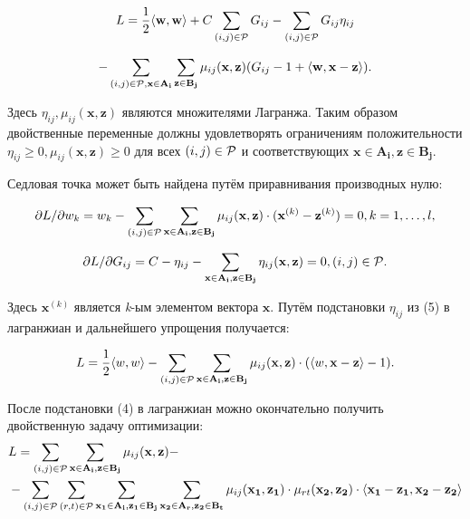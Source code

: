 \documentclass[12pt,a4paper,oneside]{article}
\begin{document}
\[
L = \frac{1}{2} \langle \mathbf{w}, \mathbf{w} \rangle + C \sum \limits_{(i, j) \in \mathcal{P}} G_{ij} - \sum \limits_{(i, j) \in \mathcal{P}} G_{ij} \eta_{ij}
\]

\[
- \sum \limits_{(i, j) \in \mathcal{P}, \mathbf{x} \in \mathbf{A_i}} \sum \limits_{\mathbf{z} \in \mathbf{B_j}} \mu_{ij}(\mathbf{x}, \mathbf{z}) (G_{ij} - 1 + \langle \mathbf{w}, \mathbf{x} - \mathbf{z} \rangle).
\]

\par
Здесь \(\eta_{ij}, \mu_{ij}(\mathbf{x}, \mathbf{z})\) являются множителями Лагранжа. 
Таким образом двойственные переменные должны удовлетворять ограничениям положительности \(\eta_{ij} \geq 0, \mu_{ij} (\mathbf{x}, \mathbf{z}) \geq 0\) для всех \((i, j) \in \mathcal{P}\) и соответствующих \(\mathbf{x} \in \mathbf{A_i}, \mathbf{z} \in \mathbf{B_j}\). 

\par
Седловая точка может быть найдена путём приравнивания производных нулю:

\[
\partial L / \partial w_k = w_k - \sum \limits_{(i, j) \in \mathcal{P}} \sum \limits_{\mathbf{x} \in \mathbf{A_i}, \mathbf{z} \in \mathbf{B_j}} \mu_{ij} (\mathbf{x}, \mathbf{z}) \cdot (\mathbf{x}^{(k)} - \mathbf{z}^{(k)}) = 0, k = 1, \dots, l,
\]

\[
\partial L / \partial G_{ij} = C - \eta_{ij} - \sum \limits_{\mathbf{x} \in \mathbf{A_i}, \mathbf{z} \in \mathbf{B_j}} \eta_{ij}(\mathbf{x}, \mathbf{z}) = 0, (i, j) \in \mathcal{P}. 
\]

\par
Здесь \(\mathbf{x}^{(k)}\) является \emph{k}-ым элементом вектора \(\mathbf{x}\). 
Путём подстановки \(\eta_{ij}\) из (5) в лагранжиан и дальнейшего упрощения получается:

\[
L = \frac{1}{2} \langle w, w \rangle - \sum \limits_{(i, j) \in \mathcal{P}} \sum \limits_{\mathbf{x} \in \mathbf{A_i}, \mathbf{z} \in \mathbf{B_j}} \mu_{ij} (\mathbf{x}, \mathbf{z}) \cdot (\langle w, \mathbf{x} - \mathbf{z} \rangle - 1).
\]

\par
После подстановки (4) в лагранжиан можно окончательно получить двойственную задачу оптимизации:
\mbox{}
\begin{eqnarray*}
&L = \sum \limits_{(i, j) \in \mathcal{P}} \sum \limits_{\mathbf{x} \in \mathbf{A_i}, \mathbf{z} \in \mathbf{B_j}} \mu_{ij} (\mathbf{x}, \mathbf{z}) - \\
&- \sum \limits_{(i, j) \in \mathcal{P}} \sum \limits_{(r, t) \in \mathcal{P}} \sum \limits_{\mathbf{x_1} \in \mathbf{A_i}, \mathbf{z_1} \in \mathbf{B_j}} \sum \limits_{\mathbf{x_2} \in \mathbf{A_r}, \mathbf{z_2} \in \mathbf{B_t}} \mu_{ij} (\mathbf{x_1}, \mathbf{z_1}) \cdot \mu_{rt} (\mathbf{x_2}, \mathbf{z_2}) \cdot \langle \mathbf{x_1} - \mathbf{z_1}, \mathbf{x_2} - \mathbf{z_2} \rangle
\end{eqnarray*}
\end{document}
